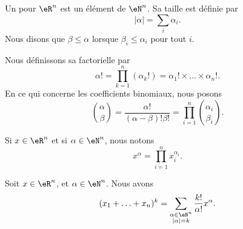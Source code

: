 \begin{definition}		\label{DEFooCQPRooFeWeOS}
	Un  pour \( \eR^n\) est un élément de \( \eN^n\). Sa taille est définie par
	\begin{equation}
		| \alpha |=\sum_i\alpha_i.
	\end{equation}
	Nous disons que \( \beta\leq \alpha\) lorsque \( \beta_i\leq \alpha_i\) pour tout \( i\).

	Nous définissons sa factorielle par
	\begin{equation}
		\alpha!=\prod_{k=1}^n(\alpha_k!)=\alpha_1!\times\ldots \times \alpha_n!.
	\end{equation}
	En ce qui concerne les coefficients binomiaux, nous posons
	\begin{equation}		\label{EQooKBURooKFBxnt}
		\binom{ \alpha }{ \beta }=\frac{ \alpha! }{ (\alpha-\beta)!\beta! }=\prod_{i=1}^n\binom{ \alpha_i }{ \beta_i }.
	\end{equation}

	Si \( x\in \eR^n\) et si \( \alpha\in \eN^n\), nous notons
	\begin{equation}
		x^{\alpha}=\prod_{i=1}^nx_i^{\alpha_i}.
	\end{equation}
\end{definition}

\begin{theorem}		\label{THOooNHAUooQvuytn}
	Soit \( x\in \eR^n\), et \( \alpha\in \eN^n\). Nous avons
	\begin{equation}
		(x_1+\ldots+x_n)^k=\sum_{\substack{ \alpha\in \eN^n \\ | \alpha |=k }  } \frac{ k! }{ \alpha! }x^{\alpha}.
	\end{equation}
\end{theorem}


